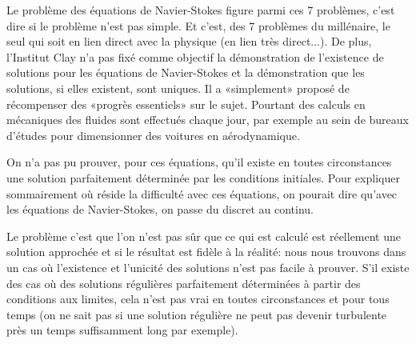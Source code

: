 \begin{histoire}
\medskip
Le problème des équations de Navier-Stokes
 figure parmi ces 7 problèmes, c'est dire
si le problème n'est pas simple. Et c'est, des 7 problèmes du millénaire, le seul
qui soit en lien direct avec la physique (en lien très direct...).
De plus, l'Institut Clay n'a pas fixé comme objectif la démonstration de l'existence
de solutions pour les équations de Navier-Stokes et la démonstration que les solutions,
si elles existent, sont uniques. Il a «simplement» proposé de récompenser des
«progrès essentiels» sur le sujet.
Pourtant des calculs en mécaniques des fluides sont effectués chaque jour, par exemple
au sein de bureaux d'études pour dimensionner des voitures en aérodynamique.

On n'a pas pu prouver, pour ces équations, qu'il existe en toutes circonstances une
solution parfaitement déterminée par les conditions initiales. 
Pour expliquer sommairement où réside la difficulté avec ces équations,
on pourait dire qu'avec les équations de Navier-Stokes, on passe du discret au continu.

\medskip
Le problème c'est que l'on n'est pas sûr que ce qui est calculé est réellement une
solution approchée et si le résultat est fidèle à la réalité: nous nous trouvons dans
un cas où l'existence et l'unicité des solutions n'est pas facile à prouver.
S'il existe des cas où des solutions régulières parfaitement déterminées à partir des
conditions aux limites, cela n'est pas vrai en toutes circonstances et pour tous temps (on
ne sait pas si une solution régulière ne peut pas devenir turbulente près un temps
suffisamment long par exemple).


\end{histoire}
